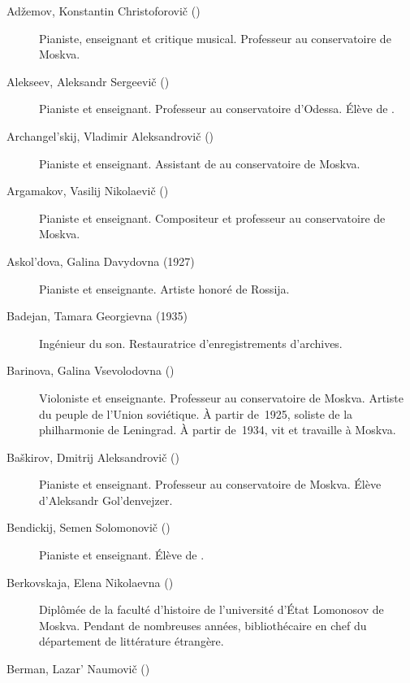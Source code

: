 \begin{description}
 \item[Adžemov, Konstantin Christoforovič ()]%
 Pianiste, enseignant et critique musical.
 Professeur au conservatoire de Moskva.
 \item[Alekseev, Aleksandr Sergeevič ()]%
 Pianiste et enseignant.
 Professeur au conservatoire d'\hbox{Odessa}.
 Élève de \HNeuhaus{}.
 \item[Archangel'skij, Vladimir Aleksandrovič ()]%
 Pianiste et enseignant.
 Assistant de \VSofronitsky{} au conservatoire de Moskva.
 \item[Argamakov, Vasilij Nikolaevič ()]%
 Pianiste et enseignant.
 Compositeur et professeur au conservatoire de Moskva.
 \item[Askol'dova, Galina Davydovna (1927\dvsborn{})]%
 Pianiste et enseignante.
 Artiste honoré de Rossija.
 \item[Badejan, Tamara Georgievna (1935\dvsborn{})]%
 Ingénieur du son.
 Restauratrice d'enregistrements d'archives.
 \item[Barinova, Galina Vsevolodovna ()]%
 Violoniste et enseignante.
 Professeur au conservatoire de Moskva.
 Artiste du peuple de l'\hbox{Union} soviétique.
 À partir de~1925, soliste de la philharmonie de Leningrad.
 À partir de~1934, vit et travaille à Moskva.
 \item[Baškirov, Dmitrij Aleksandrovič ()]%
 Pianiste et enseignant.
 Professeur au conservatoire de Moskva.
 Élève d'\hbox{Aleksandr} Gol'denvejzer.
 \item[Bendickij, Semen Solomonovič ()]%
 Pianiste et enseignant.
 Élève de \HNeuhaus{}.
 \item[Berkovskaja, Elena Nikolaevna ()]%
 Diplômée de la faculté d'histoire de l'université d'\hbox{État} Lomonosov
 de Moskva.
 Pendant de nombreuses années, bibliothécaire en chef du département de
 littérature étrangère.
 \item[Berman, Lazar' Naumovič ()]%

\end{description}
